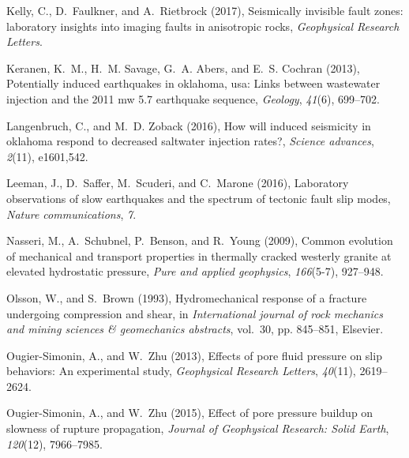 \documentclass[grl]{agutex2arxiv}
\begin{document}
\begin{article}
\begin{thebibliography}{44}
Kelly, C., D.~Faulkner, and A.~Rietbrock (2017), Seismically invisible fault
  zones: laboratory insights into imaging faults in anisotropic rocks,
  \textit{Geophysical Research Letters}.

Keranen, K.~M., H.~M. Savage, G.~A. Abers, and E.~S. Cochran (2013),
  Potentially induced earthquakes in oklahoma, usa: Links between wastewater
  injection and the 2011 mw 5.7 earthquake sequence, \textit{Geology},
  \textit{41}(6), 699--702.

Langenbruch, C., and M.~D. Zoback (2016), How will induced seismicity in
  oklahoma respond to decreased saltwater injection rates?, \textit{Science
  advances}, \textit{2}(11), e1601,542.

Leeman, J., D.~Saffer, M.~Scuderi, and C.~Marone (2016), Laboratory
  observations of slow earthquakes and the spectrum of tectonic fault slip
  modes, \textit{Nature communications}, \textit{7}.

Nasseri, M., A.~Schubnel, P.~Benson, and R.~Young (2009), Common evolution of
  mechanical and transport properties in thermally cracked westerly granite at
  elevated hydrostatic pressure, \textit{Pure and applied geophysics},
  \textit{166}(5-7), 927--948.

Olsson, W., and S.~Brown (1993), Hydromechanical response of a fracture
  undergoing compression and shear, in \textit{International journal of rock
  mechanics and mining sciences \& geomechanics abstracts}, vol.~30, pp.
  845--851, Elsevier.

Ougier-Simonin, A., and W.~Zhu (2013), Effects of pore fluid pressure on slip
  behaviors: An experimental study, \textit{Geophysical Research Letters},
  \textit{40}(11), 2619--2624.

Ougier-Simonin, A., and W.~Zhu (2015), Effect of pore pressure buildup on
  slowness of rupture propagation, \textit{Journal of Geophysical Research:
  Solid Earth}, \textit{120}(12), 7966--7985.


\end{thebibliography}
\end{article}
\end{document}
